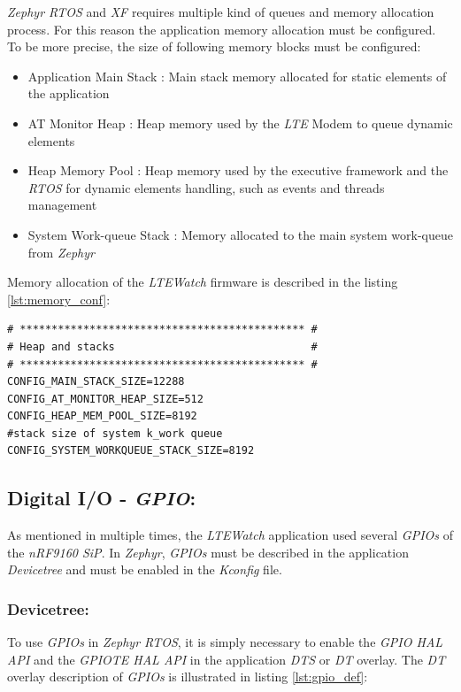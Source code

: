 \documentclass[report.tex]{subfiles}
\begin{document}
\textit{Zephyr RTOS} and \textit{XF} requires multiple kind of queues and memory allocation process. For this reason the application memory allocation must be configured. To be more precise, the size of following memory blocks must be configured:
\begin{itemize}
\item Application Main Stack :  Main stack memory allocated for static elements of the application
\item AT Monitor Heap : Heap memory used by the \textit{LTE} Modem to queue dynamic elements
\item Heap Memory Pool : Heap memory used by the executive framework and the \textit{RTOS} for dynamic elements handling, such as events and threads management
\item System Work-queue Stack : Memory allocated to the main system work-queue from \textit{Zephyr}\\
\end{itemize} 

Memory allocation of the \textit{LTEWatch} firmware is described in the listing \ref{lst:memory_conf}:
\begin{lstlisting}[style=console,label={lst:memory_conf},caption={Application Memory Configuration}]
# ********************************************* #
# Heap and stacks                               #
# ********************************************* #
CONFIG_MAIN_STACK_SIZE=12288
CONFIG_AT_MONITOR_HEAP_SIZE=512
CONFIG_HEAP_MEM_POOL_SIZE=8192
#stack size of system k_work queue
CONFIG_SYSTEM_WORKQUEUE_STACK_SIZE=8192
\end{lstlisting}

\subsection{Digital I/O - \textit{GPIO}:}
As mentioned in multiple times, the \textit{LTEWatch} application used several \textit{GPIOs} of the \textit{nRF9160 SiP}. In \textit{Zephyr}, \textit{GPIOs} must be described in the application \textit{Devicetree} and must be enabled in the \textit{Kconfig} file.

\subsubsection{Devicetree:}
To use \textit{GPIOs} in \textit{Zephyr RTOS}, it is simply necessary to enable the \textit{GPIO HAL API} and the \textit{GPIOTE HAL API} in the application \textit{DTS} or \textit{DT} overlay. The \textit{DT} overlay description of \textit{GPIOs} is illustrated in listing \ref{lst:gpio_def}:
\end{document}
